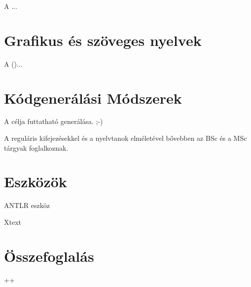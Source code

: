 \begin{definicio}
	A  ...
\end{definicio}

\section{Grafikus és szöveges nyelvek}

\begin{definicio}
	A  ()...
\end{definicio}

\section{Kódgenerálási Módszerek}

A  célja  futtatható  generálása. ;-)






A reguláris kifejezésekkel és a nyelvtanok elméletével bővebben az \algel BSc és a \nyau MSc tárgyak foglalkoznak.

\section{Eszközök\kieg}

ANTLR eszköz~\cite{Parr:2013:DAR:2501720}

Xtext~\cite{Xtext}

\section{Összefoglalás}

++
